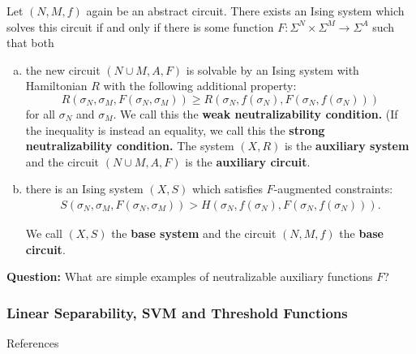 \documentclass[8pt, mathserif, notheorems]{beamer}
\begin{document}
\begin{frame}[t]
  \begin{thm}\label{lem:augmented_constraints}
  Let $(N, M, f)$ again be an abstract circuit. There exists an Ising system which solves this circuit if and only if there is some function $F:\Sigma^N\times\Sigma^M \to \Sigma^A$ such that both
  \begin{enumerate}[(a)]
    \item the new circuit $(N\cup M, A, F)$ is solvable by an Ising system with Hamiltonian $R$ with the following additional property:
      \begin{equation}\label{eqn:weak-neutralizability}\tag{$\dagger$}
        R(\sigma_N, \sigma_M, F(\sigma_N,\sigma_M)) \geq R(\sigma_N, f(\sigma_N), F(\sigma_N, f(\sigma_N)))
      \end{equation}
      for all $\sigma_N$ and $\sigma_M$. We call this the \textbf{weak neutralizability condition.} (If the inequality is instead an equality, we call this the \textbf{strong neutralizability condition.} The system $(X, R)$ is the \textbf{auxiliary system} and the circuit $(N\cup M, A, F)$ is the \textbf{auxiliary circuit}.
    \item there is an Ising system $(X, S)$ which satisfies $F$-augmented constraints: 
      \begin{align*}
        S(\sigma_N, \sigma_M, F(\sigma_N, \sigma_M)) > H(\sigma_N, f(\sigma_N), F(\sigma_N, f(\sigma_N))).
      \end{align*}

      We call $(X,S)$ the \textbf{base system} and the circuit $(N,M,f)$ the \textbf{base circuit}.
  \end{enumerate} 
\end{thm}

\bigskip

\textbf{Question:} What are simple examples of neutralizable auxiliary functions $F$?
\end{frame}
\begin{frame}\frametitle{Linear Separability, SVM and Threshold Functions}
  
\end{frame}
\begin{frame}[t]{References}

\nocite{*}
\printbibliography
\end{frame}
\end{document}
